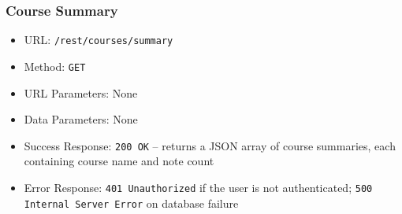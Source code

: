 \subsubsection*{Course Summary}

\begin{itemize}
    \item URL: \texttt{/rest/courses/summary}
    \item Method: \texttt{GET}
    \item URL Parameters: None
    \item Data Parameters: None
    \item Success Response: \texttt{200 OK} -- returns a JSON array of course summaries, each containing course name and note count
    \item Error Response: \texttt{401 Unauthorized} if the user is not authenticated; \texttt{500 Internal Server Error} on database failure
\end{itemize}
